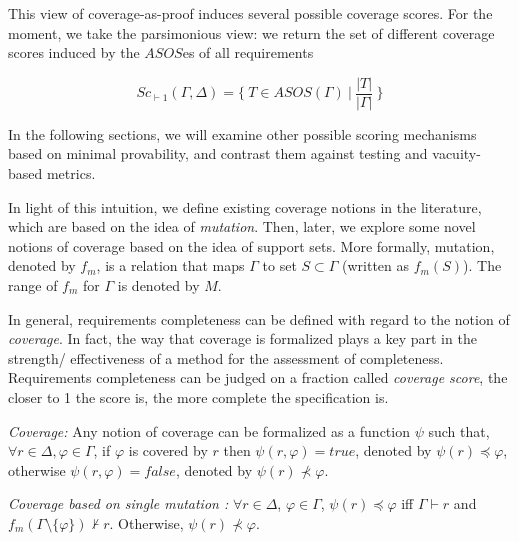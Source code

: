 This view of coverage-as-proof induces several possible coverage scores.  For the moment, we take the parsimonious view: we return the set of different coverage scores induced by the $ASOS$es of all requirements

\[
   Sc_{\vdash 1}(\Gamma, \Delta) = \{~T \in ASOS(\Gamma)~|~\frac{ | T |}{|\Gamma|}~\}
\]

\noindent In the following sections, we will examine other possible scoring mechanisms based on minimal provability, and contrast them against testing and vacuity-based metrics.


\iffalse
In light of this intuition, we define existing coverage notions in the literature, which are based on the idea of \emph{mutation}. Then, later, we explore some novel notions of coverage based on the idea of support sets.  More formally, mutation, denoted by $f_m$, is a relation that maps $\Gamma$ to set $S \subset \Gamma$ (written as $f_m (S)$). The range of $f_m$ for $\Gamma$ is denoted by $M$.

In general, requirements completeness can be defined with regard to the notion of \emph{coverage}. In fact, the way that coverage is formalized plays a key part in the strength/ effectiveness of a method for the assessment of completeness. Requirements completeness can be judged on a fraction called \emph{coverage score}, the closer to 1 the score is, the more complete the specification is.

\begin{definition}{\emph{Coverage:}}
  \label{def:coverage}
   Any notion of coverage can be formalized as a function $\psi$ such that,
   $\forall r \in \Delta, \varphi \in \Gamma$, if $\varphi$ is covered by $r$ then $\psi (r, \varphi) = true$, denoted by $\psi (r) \preccurlyeq \varphi$, otherwise  $\psi (r, \varphi) = false$, denoted by $\psi (r) \nprec \varphi$.
\end{definition}

\begin{definition} {\emph{Coverage based on single mutation \cite{chockler2010coverage, chockler_coverage_2003}:}}
  \label{def:coverage1}
   $\forall r \in \Delta$,
   $\varphi \in \Gamma$,
   $\psi (r) \preccurlyeq \varphi$
   iff $\Gamma \vdash r$ and
   $f_m (\Gamma \setminus \{ \varphi \}) \nvdash r$. Otherwise, $\psi (r) \nprec \varphi$.
\end{definition}

